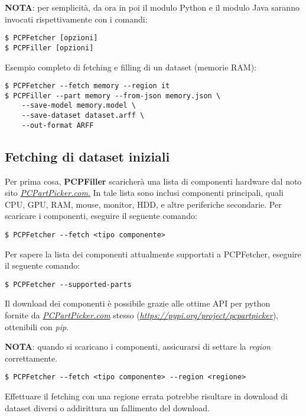 \documentclass[12pt]{report}
\begin{document}
\textbf{NOTA}: per semplicità, da ora in poi il modulo Python e il modulo Java saranno invocati
rispettivamente con i comandi:
\begin{lstlisting}
$ PCPFetcher [opzioni]
$ PCPFiller [opzioni]
\end{lstlisting}

Esempio completo di fetching e filling di un dataset (memorie RAM):
\begin{lstlisting}
$ PCPFetcher --fetch memory --region it
$ PCPFiller --part memory --from-json memory.json \
	--save-model memory.model \
	--save-dataset dataset.arff \
	--out-format ARFF
\end{lstlisting}



\newpage
\subsection{Fetching di dataset iniziali}

Per prima cosa, \textbf{PCPFiller} scaricherà una lista di componenti hardware dal noto \\
sito \underline{\textit{PCPartPicker.com}.} In tale lista sono inclusi componenti principali, quali
CPU, GPU, RAM, mouse, monitor, HDD, e altre periferiche secondarie.
Per scaricare i componenti, eseguire il seguente comando:
\begin{lstlisting}
$ PCPFetcher --fetch <tipo componente>
\end{lstlisting}

Per sapere la lista dei componenti attualmente supportati a PCPFetcher, eseguire il seguente comando:
\begin{lstlisting}
$ PCPFetcher --supported-parts
\end{lstlisting}

Il download dei componenti è possibile grazie alle ottime API per python \\
fornite da \underline{\textit{PCPartPicker.com}} stesso (\underline{\textit{https://pypi.org/project/pcpartpicker}}),
ottenibili con \textit{pip}.

\textbf{NOTA}: quando si scaricano i componenti, assicurarsi di settare la \textit{region} correttamente.
\begin{lstlisting}
$ PCPFetcher --fetch <tipo componente> --region <regione>
\end{lstlisting}

Effettuare il fetching con una regione errata potrebbe risultare in download di dataset diversi
o addirittura un fallimento del download.
\end{document}
